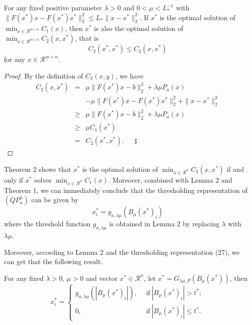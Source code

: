 \documentclass[smallextended]{svjour3}
\begin{document}
\begin{theorem}\label{th2}
For any fixed positive parameter $\lambda>0$ and $0<\mu<L_{\ast}^{-1}$ with $\|F(x^{\ast})x-F(x^{\ast})x^{\ast}\|_{2}^{2}\leq L_{\ast}\|x-x^{\ast}\|_{2}^{2}$.
If $x^{\ast}$ is the optimal solution of $\displaystyle\min_{x\in \mathcal{R}^{m\times n}}C_{1}(x)$, then $x^{\ast}$ is also the optimal solution of
$\displaystyle\min_{x\in \mathcal{R}^{m\times n}}C_{2}(x,x^{\ast})$, that is
$$C_{2}(x^{\ast},x^{\ast})\leq C_{2}(x,x^{\ast})$$
for any $x\in \mathcal{R}^{m\times n}$.
\end{theorem}
\begin{proof}
By the definition of $C_{2}(x, y)$, we have
\begin{eqnarray*}
C_{2}(x,x^{\ast})&=&\mu\|F(x^{\ast})x-b\|_{2}^{2}+\lambda\mu P_{a}(x)\\
&&-\mu\|F(x^{\ast})x-F(x^{\ast})x^{\ast}\|_{2}^{2}+\|x-x^{\ast}\|_{2}^{2}\\
&\geq&\mu\|F(x^{\ast})x-b\|_{2}^{2}+\lambda\mu P_{a}(x)\\
&\geq&\mu C_{1}(x^{\ast})\\
&=&C_{2}(x^{\ast},x^{\ast}). \ \ \ \ \ \ \ \sharp
\end{eqnarray*}
\end{proof}

Theorem 2 shows that $x^{\ast}$ is the optimal solution of $\displaystyle\min_{x\in \mathcal{R}^{n}}C_{2}(x,x^{\ast})$ if
and only if $x^{\ast}$ solves $\displaystyle\min_{x\in \mathcal{R}^{n}}C_{1}(x)$. Moreover, combined with Lemma 2 and Theorem 1,
we can immediately conclude that the thresholding representation of $(QP_{a}^{\lambda})$ can be given by
\begin{equation}\label{r28}
x_{i}^{\ast}=g_{a,\lambda\mu}(B_{\mu}(x^{\ast})_{i})
\end{equation}
where the threshold function $g_{a,\lambda\mu}$ is obtained in Lemma 2 by replacing $\lambda$ with $\lambda\mu$.

Moreover, according to Lemma 2 and the thresholding representation (27), we can get that the following result.

\begin{corollary}\label{co1}
For any fixed $\lambda>0$, $\mu>0$ and vector $x^{\ast}\in \mathcal{R}^{n}$, let $x^{\ast}=G_{\lambda\mu, P}(B_{\mu}(x^{\ast}))$, then
\begin{equation}\label{r28}
x^{\ast}_{i}=\left\{
    \begin{array}{ll}
      g_{a,\lambda\mu}(|B_{\mu}(x^{\ast})_{i}|), & \ \ \mathrm{if} \ {|B_{\mu}(x^{\ast})_{i}|> t^{\ast};} \\
      0, & \ \ \mathrm{if} \ {|B_{\mu}(x^{\ast})_{i}|\leq t^{\ast}.}
    \end{array}
  \right.
\end{equation}
\end{corollary}
\end{document}
